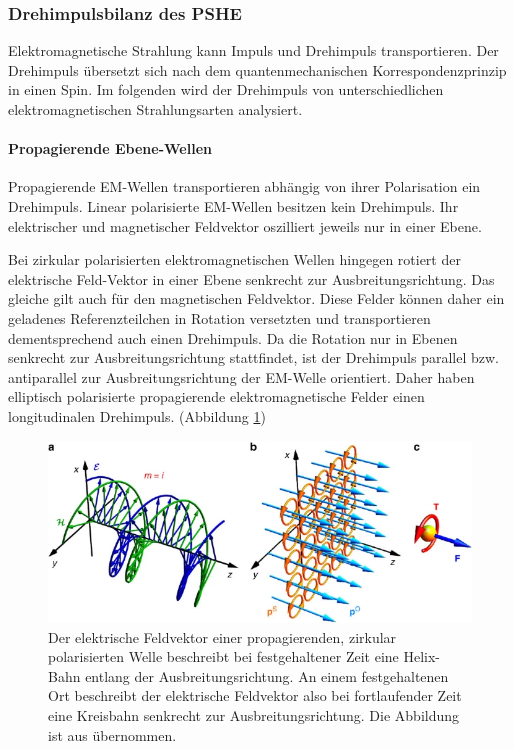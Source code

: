 \documentclass[titlepage,  ngerman]{article}
\begin{document}
	
	
	\subsubsection{Drehimpulsbilanz des PSHE}
	\label{sec:spin_spp}
	Elektromagnetische Strahlung kann Impuls und Drehimpuls transportieren. Der Drehimpuls übersetzt sich nach dem quantenmechanischen Korrespondenzprinzip in einen Spin. Im folgenden wird der Drehimpuls von unterschiedlichen elektromagnetischen Strahlungsarten analysiert.
	\paragraph{Propagierende Ebene-Wellen}
	Propagierende EM-Wellen transportieren abhängig von ihrer Polarisation ein Drehimpuls. Linear polarisierte EM-Wellen besitzen kein Drehimpuls. Ihr elektrischer und magnetischer Feldvektor oszilliert jeweils nur in einer Ebene.
	
	Bei zirkular polarisierten elektromagnetischen Wellen hingegen rotiert der elektrische Feld-Vektor in einer Ebene senkrecht zur Ausbreitungsrichtung. Das gleiche gilt auch für den magnetischen Feldvektor. Diese Felder können daher ein geladenes Referenzteilchen in Rotation versetzten und transportieren dementsprechend auch einen Drehimpuls. Da die Rotation nur in Ebenen senkrecht zur Ausbreitungsrichtung stattfindet, ist der Drehimpuls parallel bzw. antiparallel zur Ausbreitungsrichtung der EM-Welle orientiert. Daher haben elliptisch polarisierte propagierende elektromagnetische Felder einen longitudinalen Drehimpuls. (Abbildung \ref{fig:prop_spin})
	
	\begin{figure}[h]
		\centering
		\includegraphics[width=0.7\linewidth]{figures/spin/prop_spin}
		\caption[Spin propagierende EM-Welle]{Der elektrische Feldvektor einer propagierenden, zirkular polarisierten Welle beschreibt bei festgehaltener Zeit eine Helix-Bahn entlang der Ausbreitungsrichtung. An einem festgehaltenen Ort beschreibt der elektrische Feldvektor also bei fortlaufender Zeit eine Kreisbahn senkrecht zur Ausbreitungsrichtung. Die Abbildung ist aus \cite{Bliokh.2014} übernommen.}
		\label{fig:prop_spin}
	\end{figure}
	
\end{document}
